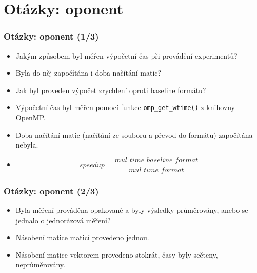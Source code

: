 \documentclass{beamer}
\begin{document}
\section{Otázky: oponent}
\begin{frame}
	\frametitle{Otázky: oponent (1/3)}
	\begin{exampleblock}{}
		\begin{itemize}
			\item Jakým způsobem byl měřen výpočetní čas při provádění experimentů?
			\item Byla do něj započítána i doba načítání matic?
			\item Jak byl proveden výpočet zrychlení oproti baseline formátu?
		\end{itemize}
	\end{exampleblock}
	\begin{alertblock}{}
	   \begin{itemize}
			\item Výpočetní čas byl měřen pomocí funkce \texttt{omp\_get\_wtime()} z knihovny OpenMP.
			\item Doba načítání matic (načítání ze souboru a převod do formátu) započítána nebyla.
			\item $$ speedup = \frac{mul\_time\_baseline\_format}{mul\_time\_format} $$
		\end{itemize}
	\end{alertblock}	
\end{frame}
\begin{frame}
	\frametitle{Otázky: oponent (2/3)}
	\begin{exampleblock}{}
		\begin{itemize}
			\item Byla měření prováděna opakovaně a byly výsledky průměrovány, anebo se jednalo o jednorázová měření?
		\end{itemize}
	\end{exampleblock}
	\begin{alertblock}{}
	   \begin{itemize}
			\item Násobení matice maticí provedeno jednou.
			\item Násobení matice vektorem provedeno stokrát, časy byly sečteny, neprůměrovány.
		\end{itemize}
	\end{alertblock}	
\end{frame}
\end{document}
